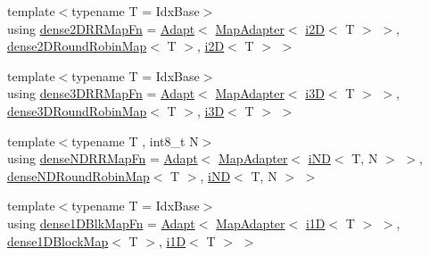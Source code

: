 \begin{DoxyCompactItemize}
\item 
{\footnotesize template$<$typename T  = Idx\+Base$>$ }\\using \hyperlink{namespacevt_1_1mapping_a7a86c7f1af7a323cd67e97e8897804e4}{dense2\+D\+R\+R\+Map\+Fn} = \hyperlink{namespacevt_1_1mapping_aafe187035ce8df02f31983e37cdb6a5d}{Adapt}$<$ \hyperlink{namespacevt_1_1mapping_a41b113c28bb6430fbcb5be66e08ccf9f}{Map\+Adapter}$<$ \hyperlink{namespacevt_1_1mapping_a6448c875e0807b43f31e96fc5b0cec04}{i2D}$<$ T $>$ $>$, \hyperlink{namespacevt_1_1mapping_ac606a5886c93a4dbb05dfead285c30c6}{dense2\+D\+Round\+Robin\+Map}$<$ T $>$, \hyperlink{namespacevt_1_1mapping_a6448c875e0807b43f31e96fc5b0cec04}{i2D}$<$ T $>$ $>$
\item 
{\footnotesize template$<$typename T  = Idx\+Base$>$ }\\using \hyperlink{namespacevt_1_1mapping_adb1f9b4ca3e67e3b47ca1a562f656217}{dense3\+D\+R\+R\+Map\+Fn} = \hyperlink{namespacevt_1_1mapping_aafe187035ce8df02f31983e37cdb6a5d}{Adapt}$<$ \hyperlink{namespacevt_1_1mapping_a41b113c28bb6430fbcb5be66e08ccf9f}{Map\+Adapter}$<$ \hyperlink{namespacevt_1_1mapping_af435b967b9ed1ccb5ec4effdbd9abd13}{i3D}$<$ T $>$ $>$, \hyperlink{namespacevt_1_1mapping_aa48fa3b830b637787c584dbac5bba6db}{dense3\+D\+Round\+Robin\+Map}$<$ T $>$, \hyperlink{namespacevt_1_1mapping_af435b967b9ed1ccb5ec4effdbd9abd13}{i3D}$<$ T $>$ $>$
\item 
{\footnotesize template$<$typename T , int8\+\_\+t N$>$ }\\using \hyperlink{namespacevt_1_1mapping_af7eabd4006a3462a6ae120d52cc638a1}{dense\+N\+D\+R\+R\+Map\+Fn} = \hyperlink{namespacevt_1_1mapping_aafe187035ce8df02f31983e37cdb6a5d}{Adapt}$<$ \hyperlink{namespacevt_1_1mapping_a41b113c28bb6430fbcb5be66e08ccf9f}{Map\+Adapter}$<$ \hyperlink{namespacevt_1_1mapping_ad53b53dc14e67437c17cefe9c3c70380}{i\+ND}$<$ T, N $>$ $>$, \hyperlink{namespacevt_1_1mapping_a270a829564506d7b8de50c9867ff2b76}{dense\+N\+D\+Round\+Robin\+Map}$<$ T $>$, \hyperlink{namespacevt_1_1mapping_ad53b53dc14e67437c17cefe9c3c70380}{i\+ND}$<$ T, N $>$ $>$
\item 
{\footnotesize template$<$typename T  = Idx\+Base$>$ }\\using \hyperlink{namespacevt_1_1mapping_aa1117076bb1d73ecb84905dc391c0528}{dense1\+D\+Blk\+Map\+Fn} = \hyperlink{namespacevt_1_1mapping_aafe187035ce8df02f31983e37cdb6a5d}{Adapt}$<$ \hyperlink{namespacevt_1_1mapping_a41b113c28bb6430fbcb5be66e08ccf9f}{Map\+Adapter}$<$ \hyperlink{namespacevt_1_1mapping_af0c14a9a77e0311b3d089143ed93ba76}{i1D}$<$ T $>$ $>$, \hyperlink{namespacevt_1_1mapping_a2d49151f03d4ce393b01c620f6b18517}{dense1\+D\+Block\+Map}$<$ T $>$, \hyperlink{namespacevt_1_1mapping_af0c14a9a77e0311b3d089143ed93ba76}{i1D}$<$ T $>$ $>$

\end{DoxyCompactItemize}

